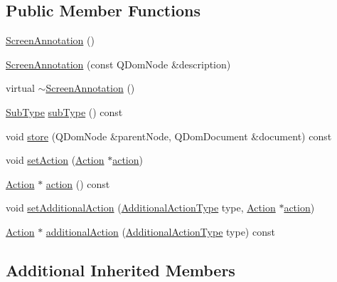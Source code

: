 \subsection*{Public Member Functions}
\begin{DoxyCompactItemize}
\item 
\hyperlink{classOkular_1_1ScreenAnnotation_a902b714ff6036ca42d6a34290a95822b}{Screen\+Annotation} ()
\item 
\hyperlink{classOkular_1_1ScreenAnnotation_a7a6398a1245f38711231f8c5863083cb}{Screen\+Annotation} (const Q\+Dom\+Node \&description)
\item 
virtual \hyperlink{classOkular_1_1ScreenAnnotation_a104b8b3f2e103c0a5a780eb30fb5a18e}{$\sim$\+Screen\+Annotation} ()
\item 
\hyperlink{classOkular_1_1Annotation_af71b46e37d5f850b97d5c4de3be9aac0}{Sub\+Type} \hyperlink{classOkular_1_1ScreenAnnotation_a6a112e1ac2da9bf5d280f1c1d489f7d4}{sub\+Type} () const 
\item 
void \hyperlink{classOkular_1_1ScreenAnnotation_ae09a4de6600094602ea8089cdd91ce6f}{store} (Q\+Dom\+Node \&parent\+Node, Q\+Dom\+Document \&document) const 
\item 
void \hyperlink{classOkular_1_1ScreenAnnotation_a303459d8d1199ad44736f293bf2f6cb1}{set\+Action} (\hyperlink{classOkular_1_1Action}{Action} $\ast$\hyperlink{classOkular_1_1ScreenAnnotation_a7089901b395a88a805e404e4d8a6c75f}{action})
\item 
\hyperlink{classOkular_1_1Action}{Action} $\ast$ \hyperlink{classOkular_1_1ScreenAnnotation_a7089901b395a88a805e404e4d8a6c75f}{action} () const 
\item 
void \hyperlink{classOkular_1_1ScreenAnnotation_a1ace12f2b70a92e52383cf1e5e12f942}{set\+Additional\+Action} (\hyperlink{classOkular_1_1Annotation_aa34152e337b1cb13e9327f37fc295057}{Additional\+Action\+Type} type, \hyperlink{classOkular_1_1Action}{Action} $\ast$\hyperlink{classOkular_1_1ScreenAnnotation_a7089901b395a88a805e404e4d8a6c75f}{action})
\item 
\hyperlink{classOkular_1_1Action}{Action} $\ast$ \hyperlink{classOkular_1_1ScreenAnnotation_a4dac97a301ef637bc2684b45e02f88d3}{additional\+Action} (\hyperlink{classOkular_1_1Annotation_aa34152e337b1cb13e9327f37fc295057}{Additional\+Action\+Type} type) const 
\end{DoxyCompactItemize}
\subsection*{Additional Inherited Members}


